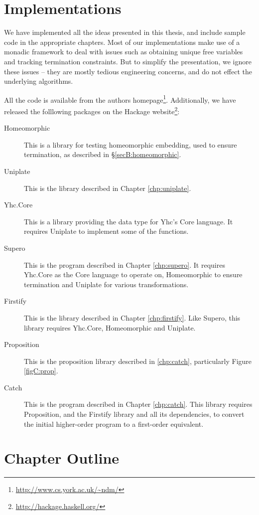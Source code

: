 \section{Implementations}

We have implemented all the ideas presented in this thesis, and include sample code in the appropriate chapters. Most of our implementations make use of a monadic framework to deal with issues such as obtaining unique free variables and tracking termination constraints. But to simplify the presentation, we ignore these issues -- they are mostly tedious engineering concerns, and do not effect the underlying algorithms.

All the code is available from the authors homepage\footnote{\url{http://www.cs.york.ac.uk/~ndm/}}. Additionally, we have released the folllowing packages on the Hackage website\footnote{\url{http://hackage.haskell.org/}}:

\begin{description}
\item[Homeomorphic] This is a library for testing homeomorphic embedding, used to ensure termination, as described in \S\ref{secB:homeomorphic}.
\item[Uniplate] This is the library described in Chapter \ref{chp:uniplate}.
\item[Yhc.Core] This is a library providing the data type for Yhc's Core language. It requires Uniplate to implement some of the functions.
\item[Supero] This is the program described in Chapter \ref{chp:supero}. It requires Yhc.Core as the Core language to operate on, Homeomorphic to ensure termination and Uniplate for various transformations.
\item[Firstify] This is the library described in Chapter \ref{chp:firstify}. Like Supero, this library requires Yhc.Core, Homeomorphic and Uniplate.
\item[Proposition] This is the proposition library described in \ref{chp:catch}, particularly Figure \ref{figC:prop}.
\item[Catch] This is the program described in Chapter \ref{chp:catch}. This library requires Proposition, and the Firstify library and all its dependencies, to convert the initial higher-order program to a first-order equivalent.
\end{description}

\section{Chapter Outline}

